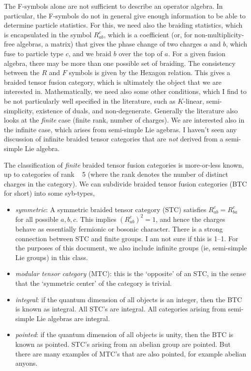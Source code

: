 \documentclass[12pt]{article}
\begin{document}
The F-symbols alone are not sufficient to describe an operator algebra.  In particular, the F-symbols
do not in general give enough information to be able to determine particle statistics. For
this, we need also the braiding statistics, which is encapsulated in the symbol $R^{c}_{ab}$, which
is a coefficient (or, for non-multiplicity-free algebras, a matrix) that gives the phase change
of two charges $a$ and $b$, which fuse to particle type $c$, and we braid $b$ over the top of $a$.
For a given fusion algebra, there may be more than one possible set of braiding. The consistency
between the $R$ and $F$ symbols is given by the Hexagon relation. This gives
a braided tensor fusion category, which is ultimately the object that we are interested in.
Mathematically, we need also some other conditions, which I find to be not particularly well specified
in the literature, such as $K$-linear, semi-simplicity, existence of duals, and non-degenerate. 
Generally the literature
also looks at the \emph{finite} case (finite rank, number of charges). We are interested also in the infinite case,
which arises from semi-simple Lie agebras. I haven't seen any discussion of infinite braided tensor
categories that are \emph{not} derived from a semi-simple Lie algebra.

The classification of \emph{finite} braided tensor fusion categories is more-or-less known, up to
categories of rank ~ 5 (where the rank denotes the number of distinct charges in the category).
We can subdivide braided tensor fusion categories (BTC for short) into some syb-types,
\begin{itemize}
\item \emph{symmetric}: A symmetric braided tensor category (STC) satisfies $R^{c}_{ab} = R^{c}_{ba}$ for
all possible $a,b,c$. This implies $(R^{c}_{ab})^2 = 1$, and hence the charges behave as essentially
fermionic or bosonic character. There is a strong connection between STC and finite groups. I am not sure
if this is 1--1. For the purposes of this document, we also include infinite groups (ie, semi-simple
Lie groups) in this class. 
\item \emph{modular tensor category} (MTC): this is the `opposite' of an STC, in the sense that the
`symmetric center' of the category is trivial. 
\item \emph{integral}: if the quantum dimension of all objects is an integer, then the BTC is known as integral. 
All STC's are integral. All categories arising from semi-simple Lie algebras are integral.
\item \emph{pointed}: if the quantum dimension of all objects is unity, then the BTC is known as pointed.
STC's arising from an abelian group are pointed. But there are many examples of MTC's that are also pointed,
for example abelian anyons.
\end{itemize}
\end{document}
